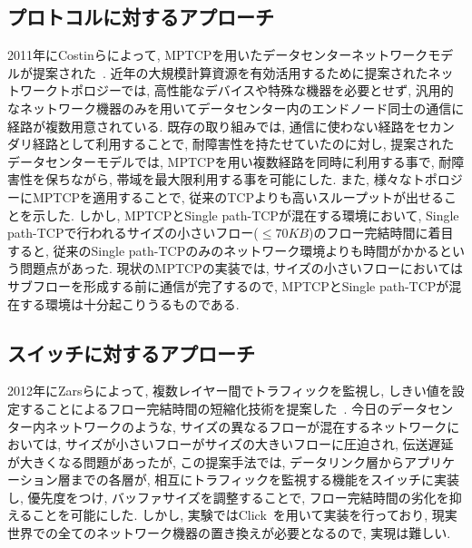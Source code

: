 \documentclass[11pt, a4paper, uplatex]{jsarticle}
\begin{document}
\subsection{プロトコルに対するアプローチ}
2011年にCostinらによって, MPTCPを用いたデータセンターネットワークモデルが提案された~\cite{improving}.
近年の大規模計算資源を有効活用するために提案されたネットワークトポロジーでは,
高性能なデバイスや特殊な機器を必要とせず, 汎用的なネットワーク機器のみを用いてデータセンター内のエンドノード同士の通信に経路が複数用意されている.
既存の取り組みでは, 通信に使わない経路をセカンダリ経路として利用することで, 耐障害性を持たせていたのに対し, 提案されたデータセンターモデルでは,
MPTCPを用い複数経路を同時に利用する事で, 耐障害性を保ちながら, 帯域を最大限利用する事を可能にした.
また, 様々なトポロジーにMPTCPを適用することで, 従来のTCPよりも高いスループットが出せることを示した.
しかし, MPTCPとSingle path-TCPが混在する環境において, Single
path-TCPで行われるサイズの小さいフロー($\leq70KB$)のフロー完結時間に着目すると, 従来のSingle
path-TCPのみのネットワーク環境よりも時間がかかるという問題点があった.
現状のMPTCPの実装では, サイズの小さいフローにおいてはサブフローを形成する前に通信が完了するので, MPTCPとSingle
path-TCPが混在する環境は十分起こりうるものである\cite{mptcp_ana}.
\subsection{スイッチに対するアプローチ}
2012年にZarsらによって, 複数レイヤー間でトラフィックを監視し,
しきい値を設定することによるフロー完結時間の短縮化技術を提案した~\cite{detail}.
今日のデータセンター内ネットワークのような, サイズの異なるフローが混在するネットワークにおいては, サイズが小さいフローがサイズの大きいフローに圧迫され,
伝送遅延が大きくなる問題があったが, この提案手法では, データリンク層からアプリケーション層までの各層が,
相互にトラフィックを監視する機能をスイッチに実装し, 優先度をつけ, バッファサイズを調整することで, フロー完結時間の劣化を抑えることを可能にした.
しかし, 実験ではClick~\cite{click}を用いて実装を行っており, 現実世界での全てのネットワーク機器の置き換えが必要となるので, 実現は難しい.
\end{document}
